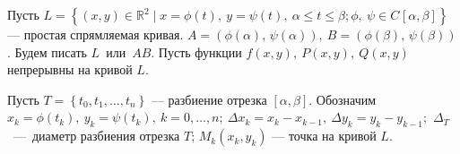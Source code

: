 \documentclass[a4paper,10pt]{article}
\begin{document}
	
	\jeolmnewheader
	
Пусть $L = \left\{ (x, y) \in \mathbb{R}^2 \mid x = \phi(t), ~ y = \psi(t), ~ \alpha \le t \le \beta; \phi, ~ \psi \in C\mspace{1mu}[\alpha, \beta] \right\}$ --- простая спрямляемая кривая. $A = (\phi(\alpha), \, \psi(\alpha)), ~ B = (\phi(\beta), \, \psi(\beta))$. Будем писать $L$~или~$AB$. Пусть функции $f(x, y), ~ P(x, y), ~ Q(x, y)$ непрерывны на кривой $L$.

\begin{defn}
Пусть $T = \left\{t_0, t_1, \dots , t_n \right\}$ --- разбиение отрезка $[\alpha, \beta]$. Обозначим $x_k = \phi(t_k), ~ y_k = \psi(t_k), ~ k = 0, \dots, n; ~ \Delta x_k = x_k - x_{k-1}, ~ \Delta y_k = y_k - y_{k - 1};$ \mbox{$\Delta_{T}$ --- диаметр} разбиения отрезка $T$; $M_k(x_k, y_k)$ --- точка на кривой $L$.
\end{defn}


\end{document}
